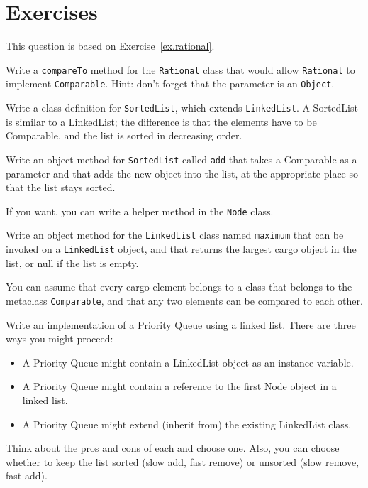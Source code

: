 \section{Exercises}

\begin{exercise}
This question is based on Exercise~\ref{ex.rational}.

Write a {\tt compareTo} method for the {\tt Rational} class
that would allow {\tt Rational} to implement {\tt Comparable}.
Hint: don't forget that the parameter is an {\tt Object}.
\end{exercise}


\begin{exercise}
Write a class definition for {\tt SortedList}, which extends
{\tt LinkedList}.  A SortedList is similar to a LinkedList; the
difference is that the elements have to be Comparable, and the
list is sorted in decreasing order.

Write an object method for {\tt SortedList}
called {\tt add} that takes a Comparable as a parameter and that
adds the new object into the list,
at the appropriate place so
that the list stays sorted.

If you want, you can write a helper method in the {\tt Node} class.
\end{exercise}


\begin{exercise}
Write an object method for the {\tt LinkedList} class
named {\tt maximum} that can be invoked on a
{\tt LinkedList} object, and that returns the largest cargo
object in the list, or null if the list is empty.

You can assume that every cargo element belongs to a class that
belongs to the metaclass {\tt Comparable}, and that any two
elements can be compared to each other.
\end{exercise}



\begin{exercise}
Write an implementation of a Priority Queue using
a linked list.  There are three ways you might proceed:

\begin{itemize}

\item A Priority Queue might contain a LinkedList object as an
instance variable.

\item A Priority Queue might contain a reference to the
first Node object in a linked list.

\item A Priority Queue might extend (inherit from) the existing
LinkedList class.

\end{itemize}
%
Think about the pros and cons of each and choose one.  Also, you
can choose whether to keep the list sorted (slow add, fast remove)
or unsorted (slow remove, fast add).
\end{exercise}


